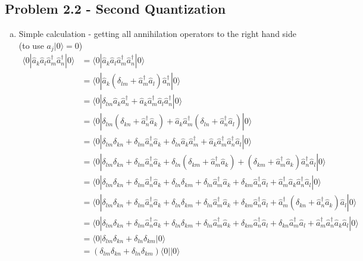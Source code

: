 \documentclass[../main.tex]{subfiles}
\begin{document}
\subsection{Problem 2.2 - Second Quantization}
\begin{enumerate}[(a)]
\item Simple calculation - getting all annihilation operators to the right hand side (to use $a_j|0\rangle=0$)
\begin{align}
\langle0|\hat{a}_k\hat{a}_l\hat{a}^\dagger_m\hat{a}^\dagger_n|0\rangle
&=\langle0|\hat{a}_k\hat{a}_l\hat{a}^\dagger_m\hat{a}^\dagger_n|0\rangle\\
&=\langle0|\hat{a}_k(\delta_{lm}+\hat{a}^\dagger_m\hat{a}_l)\hat{a}^\dagger_n|0\rangle\\
&=\langle0|\delta_{lm}\hat{a}_k\hat{a}^\dagger_n + \hat{a}_k\hat{a}^\dagger_m\hat{a}_l\hat{a}^\dagger_n|0\rangle\\
&=\langle0|\delta_{lm}(\delta_{kn}+\hat{a}^\dagger_n\hat{a}_k) + \hat{a}_k\hat{a}^\dagger_m(\delta_{ln}+\hat{a}^\dagger_n\hat{a}_l)|0\rangle\\
&=\langle0|\delta_{lm}\delta_{kn}+\delta_{lm}\hat{a}^\dagger_n\hat{a}_k + \delta_{ln}\hat{a}_k\hat{a}^\dagger_m+\hat{a}_k\hat{a}^\dagger_m\hat{a}^\dagger_n\hat{a}_l|0\rangle\\
&=\langle0|\delta_{lm}\delta_{kn}+\delta_{lm}\hat{a}^\dagger_n\hat{a}_k + \delta_{ln}(\delta_{km}+\hat{a}^\dagger_m\hat{a}_k)+(\delta_{km}+\hat{a}^\dagger_m\hat{a}_k)\hat{a}^\dagger_n\hat{a}_l|0\rangle\\
&=\langle0|\delta_{lm}\delta_{kn}+\delta_{lm}\hat{a}^\dagger_n\hat{a}_k + \delta_{ln}\delta_{km}+\delta_{ln}\hat{a}^\dagger_m\hat{a}_k+\delta_{km}\hat{a}^\dagger_n\hat{a}_l+\hat{a}^\dagger_m\hat{a}_k\hat{a}^\dagger_n\hat{a}_l|0\rangle\\
&=\langle0|\delta_{lm}\delta_{kn}+\delta_{lm}\hat{a}^\dagger_n\hat{a}_k + \delta_{ln}\delta_{km}+\delta_{ln}\hat{a}^\dagger_m\hat{a}_k+\delta_{km}\hat{a}^\dagger_n\hat{a}_l+\hat{a}^\dagger_m(\delta_{kn}+\hat{a}^\dagger_n\hat{a}_k)\hat{a}_l|0\rangle\\
&=\langle0|\delta_{lm}\delta_{kn}+\delta_{lm}\hat{a}^\dagger_n\hat{a}_k + \delta_{ln}\delta_{km}+\delta_{ln}\hat{a}^\dagger_m\hat{a}_k+\delta_{km}\hat{a}^\dagger_n\hat{a}_l+\delta_{kn}\hat{a}^\dagger_m\hat{a}_l+\hat{a}^\dagger_m\hat{a}^\dagger_n\hat{a}_k\hat{a}_l|0\rangle\\
&=\langle0|\delta_{lm}\delta_{kn}+\delta_{ln}\delta_{km}|0\rangle\\
&=(\delta_{lm}\delta_{kn}+\delta_{ln}\delta_{km})\langle0||0\rangle\\

\end{align}
\end{enumerate}
\end{document}

